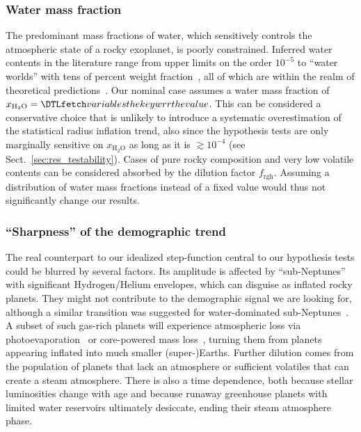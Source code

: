 \documentclass[twocolumn,twocolappendix]{aastex631}
\begin{document}
\subsubsection{Water mass fraction}
The predominant mass fractions of water, which sensitively controls the atmospheric state of a rocky exoplanet, is poorly constrained.
Inferred water contents in the literature range from upper limits on the order $10^{-5}$ to ``water worlds'' with tens of percent weight fraction~\citep[e.g.,][]{Rogers2010,Unterborn2018,Mousis2020,Agol2021,Luque2022}, all of which are within the realm of theoretical predictions~\citep{Mulders2015b,Sato2016,Jin2018,Bitsch2019b,Venturini2020,Emsenhuber2021b,Schlecker2021}.
Our nominal case assumes a water mass fraction of $x_\mathrm{H_2O} = \var{wrr}$.
This can be considered a conservative choice that is unlikely to introduce a systematic overestimation of the statistical radius inflation trend, also since the hypothesis tests are only marginally sensitive on $x_\mathrm{H_2O}$ as long as it is $\gtrsim 10^{-4}$ (see Sect.~\ref{sec:res_testability}).
Cases of pure rocky composition and very low volatile contents can be considered absorbed by the dilution factor $f_\mathrm{rgh}$.
Assuming a distribution of water mass fractions instead of a fixed value would thus not significantly change our results.

\subsubsection{``Sharpness'' of the demographic trend}
The real counterpart to our idealized step-function central to our hypothesis tests could be blurred by several factors.
Its amplitude is affected by ``sub-Neptunes'' with significant Hydrogen/Helium envelopes, which can disguise as inflated rocky planets.
They might not contribute to the demographic signal we are looking for, although a similar transition was suggested for water-dominated sub-Neptunes~\citep{Pierrehumbert2022}.
A subset of such gas-rich planets will experience atmospheric loss via photoevaporation~\citep{Owen2013} or core-powered mass loss~\citep{Ginzburg2018}, turning them from planets appearing inflated into much smaller \mbox{(super-)Earths}.
Further dilution comes from the population of planets that lack an atmosphere or sufficient volatiles that can create a steam atmosphere.
There is also a time dependence, both because stellar luminosities change with age and because runaway greenhouse planets with limited water reservoirs ultimately desiccate, ending their steam atmosphere phase.
\end{document}
